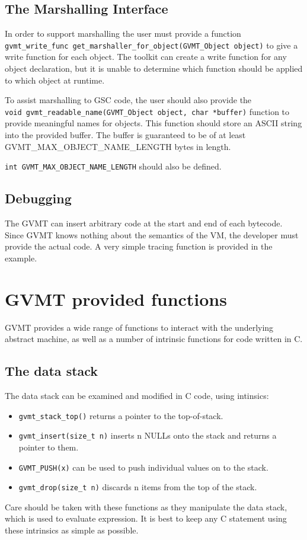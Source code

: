\subsection{The Marshalling Interface}
In order to support marshalling the user must provide a function \\
\verb|gvmt_write_func get_marshaller_for_object(GVMT_Object object)| to give a write function for each object. The toolkit can create a write function for any object declaration, but it is unable to determine which function should be applied to which object at runtime. 

To assist marshalling to GSC code, the user should also provide the \\
\verb|void gvmt_readable_name(GVMT_Object object, char *buffer)| function to provide meaningful names for objects.
This function should store an ASCII string into the provided buffer. The buffer is guaranteed to be of at least GVMT\_MAX\_OBJECT\_NAME\_LENGTH bytes in length. 

\verb|int GVMT_MAX_OBJECT_NAME_LENGTH| should also be defined.

\subsection{Debugging}
The GVMT can insert arbitrary code at the start and end of each bytecode. Since GVMT knows nothing about the semantics of the VM, the developer must provide the actual code. A very simple tracing function is provided in the example.

\section{GVMT provided functions}
GVMT provides a wide range of functions to interact with the underlying abstract machine, as well as a number of intrinsic functions for code written in C.

\subsection{The data stack}
The data stack can be examined and modified in C code, using intinsics:
\begin{itemize}
\item \verb|gvmt_stack_top()| returns a pointer to the top-of-stack.
\item \verb|gvmt_insert(size_t n)| inserts n NULLs onto the stack and returns a pointer to them.
\item \verb|GVMT_PUSH(x)| can be used to push individual values on to the stack.
\item \verb|gvmt_drop(size_t n)| discards n items from the top of the stack.
\end{itemize}
Care should be taken with these functions as they manipulate the data stack, which is used to evaluate expression. It is best to keep any C statement using these intrinsics as simple as possible.

